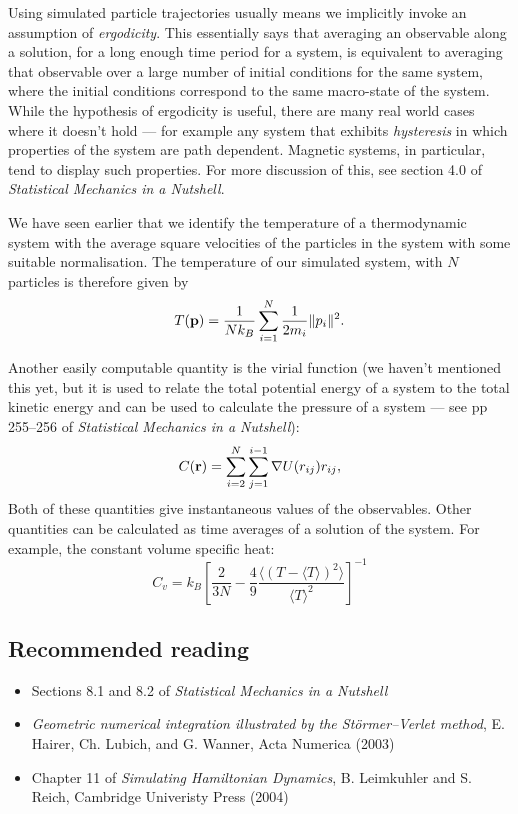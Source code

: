 Using simulated particle trajectories usually means we implicitly invoke an assumption of \emph{ergodicity}. This essentially says that averaging an observable along a solution, for a long enough time period for a system, is equivalent to averaging that observable over a large number of initial conditions for the same system, where the initial conditions correspond to the same macro-state of the system. While the hypothesis of ergodicity is useful, there are many real world cases where it doesn't hold --- for example any system that exhibits \emph{hysteresis} in which properties of the system are path dependent. Magnetic systems, in particular, tend to display such properties. For more discussion of this, see section 4.0 of \emph{Statistical Mechanics in a Nutshell}.

We have seen earlier that we identify the temperature of a thermodynamic system with the average square velocities of the particles in the system with some suitable normalisation. The temperature of our simulated system, with $N$ particles is therefore given by
$$
	T({\bf p}) = \frac{1}{Nk_B}\sum_{i=1}^N\frac{1}{2m_i}\|p_i\|^2.
$$

Another easily computable quantity is the virial function (we haven't mentioned this yet, but it is used to relate the total potential energy of a system to the total kinetic energy and can be used to calculate the pressure of a system --- see pp 255--256 of \emph{Statistical Mechanics in a Nutshell}):
$$
	C({\bf r}) = \sum_{i=2}^N\sum_{j=1}^{i-1}\nabla U(r_{ij})r_{ij},
$$
Both of these quantities give instantaneous values of the observables. Other quantities can be calculated as time averages of a solution of the system. For example, the constant volume specific heat:
$$
	C_v = k_B\left[\frac{2}{3N}-\frac{4}{9}\frac{\langle(T-\langle T\rangle)^2\rangle}{\langle T\rangle^2}\right]^{-1}
$$

\subsection{Recommended reading}
\begin{itemize}
	\item Sections 8.1 and 8.2 of \emph{Statistical Mechanics in a Nutshell}
	\item \emph{Geometric numerical integration illustrated by the St\"{o}rmer–Verlet method}, E. Hairer, Ch. Lubich, and G. Wanner, Acta Numerica (2003)
	\item Chapter 11 of \emph{Simulating Hamiltonian Dynamics}, B. Leimkuhler and S. Reich, Cambridge Univeristy Press (2004)
\end{itemize}
